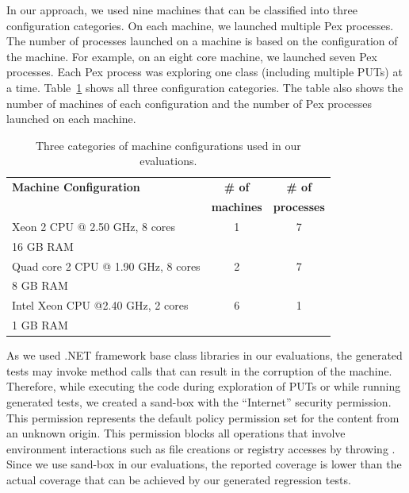 In our approach, we used nine machines that can be classified into three 
configuration categories. On each machine, we launched multiple Pex
processes. The number of processes launched on a machine is
based on the configuration of the machine. For example, on an
eight core machine, we launched seven Pex processes. Each Pex process
was exploring one class (including multiple PUTs) at a time.
Table~\ref{tab:mconfig} shows all three configuration
categories. The table also shows the number of machines
of each configuration and the number of Pex processes launched on each machine.

\setlength{\tabcolsep}{1pt}
\begin{table}[t]
\begin{SmallOut}
\begin{CodeOut}
\begin{center}
\begin {tabular} {|l|c|c|}
\hline
\textbf{Machine Configuration} & \textbf{\# of} & \textbf{\# of} \\  
 & \textbf{machines} & \textbf{processes}\\  
\hline
\hline  Xeon 2 CPU @ 2.50 GHz, 8 cores & 1 & 7\\
				16 GB RAM & & \\
\hline  Quad core 2 CPU @ 1.90 GHz, 8 cores& 2 & 7\\
				8 GB RAM & & \\
\hline  Intel Xeon CPU @2.40 GHz, 2 cores& 6 & 1\\
				1 GB RAM & & \\
\hline
\end{tabular}
\end{center}
\end{CodeOut}
\end{SmallOut}\vspace*{-4ex}
\centering \caption {\label{tab:mconfig}Three categories of machine configurations used in our evaluations.}
\end{table}

As we used .NET framework base class libraries in our evaluations, the generated tests
may invoke method calls that can result in the corruption of the machine. Therefore,
while executing the code during exploration of PUTs or while running generated tests,
we created a sand-box with the ``Internet'' security permission. This permission
represents the default policy permission set for the content from an unknown origin.
This permission blocks all operations that involve environment interactions such
as file creations or registry accesses by throwing .
Since we use sand-box in our evaluations, the reported coverage
is lower than the actual coverage that can be achieved by our generated regression
tests.

